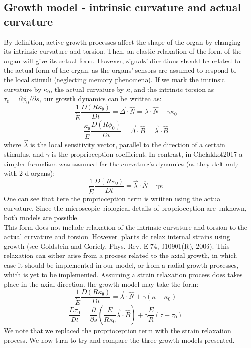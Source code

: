\documentclass[a4paper, 11pt]{article}
\begin{document}
\subsection*{Growth model - intrinsic curvature and actual curvature}
By definition, active growth processes affect the shape of the organ by changing its intrinsic curvature and torsion. Then, an elastic relaxation of the form of the organ will give its actual form. However, signals' directions should be related to the actual form of the organ, as the organs' sensors are assumed to respond to the local stimuli (neglecting memory phenomena). If we mark the intrinsic curvature by $\kappa_0$, the actual curvature by $\kappa$, and the intrinsic torsion as $\tau_0=\partial \phi_0/\partial s$, our growth dynamics can be written as:\\
\begin{equation}\label{eq:prop}
        \frac{1}{\dot{E}}\frac{D(R\kappa_0)}{Dt}=\vec{\Delta}\cdot\hat{N}=\vec{\lambda}\cdot\hat{N}-\gamma \kappa_0
\end{equation}
\begin{equation}
    \frac{\kappa_0}{\dot{E}} \frac{D(R\phi_0)}{Dt}=\vec{\Delta}\cdot\hat{B}=\vec{\lambda}\cdot\hat{B}
\end{equation}
where $\vec{\lambda}$ is the local sensitivity vector, parallel to the direction of a certain stimulus, and $\gamma$ is the proprioception coefficient. In contrast, in Chelakkot2017 a simpler formalism was assumed for the curvature's dynamics (as they delt only with 2-d organs):
\begin{equation}\label{eq:prop2}
        \frac{1}{\dot{E}}\frac{D(R\kappa_0)}{Dt}=\vec{\lambda}\cdot\hat{N}-\gamma \kappa
\end{equation}
One can see that here the proprioception term is written using the actual curvature. Since the microscopic biological details of proprioception are unknown, both models are possible.\\ 

\noindent This form does not include relaxation of the intrinsic curvature and torsion to the actual curvature and torsion. However, plants do relax internal strains using growth (see Goldstein and Goriely, Phys. Rev. E 74, 010901(R), 2006). This relaxation can either arise from a process related to the axial growth, in which case it should be implemented in our model, or from a radial growth processes, which is yet to be implemented. Assuming a strain relaxation process does takes place in the axial direction, the growth model may take the form:
\begin{equation}\label{eq:relax}
        \frac{1}{\dot{E}}\frac{D(R\kappa_0)}{Dt}=\vec{\lambda}\cdot\hat{N}+\gamma (\kappa-\kappa_0)
\end{equation}
\begin{equation}
     \frac{D\tau_0}{Dt}=\frac{\partial}{\partial s} \left(\frac{\dot{E}}{R\kappa_0}\vec{\lambda}\cdot\hat{B}\right)+\gamma\frac{\dot{E}}{R} (\tau-\tau_0)
\end{equation}
We note that we replaced the proprioception term with the strain relaxation process. We now turn to try and compare the three growth models presented.
\end{document}
